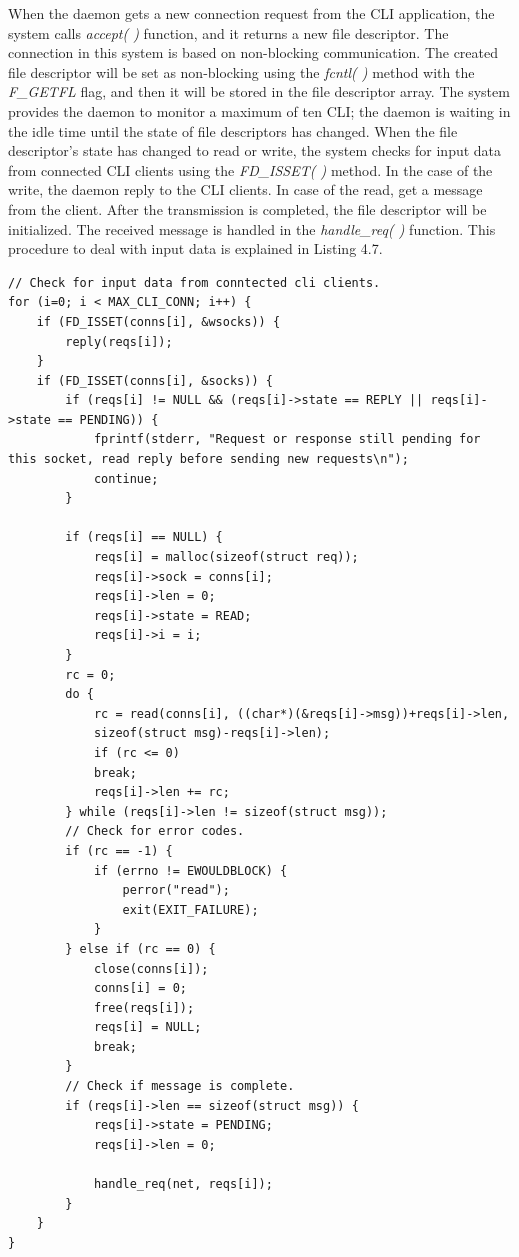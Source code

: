 When the daemon gets a new connection request from the CLI application, the system calls \textit{accept( )} function, and it returns a new file descriptor. The connection in this system is based on non-blocking communication. The created file descriptor will be set as non-blocking using the \textit{fcntl( )} method with the \textit{F\_GETFL} flag, and then it will be stored in the file descriptor array.
The system provides the daemon to monitor a maximum of ten CLI; the daemon is waiting in the idle time until the state of file descriptors has changed. When the file descriptor's state has changed to read or write, the system checks for input data from connected CLI clients using the \textit{FD\_ISSET( )} method. In the case of the write, the daemon reply to the CLI clients. In case of the read, get a message from the client. After the transmission is completed, the file descriptor will be initialized. The received message is handled in the \textit{handle\_req( )} function. This procedure to deal with input data is explained in Listing 4.7.

\lstset{language=C} 
\begin{lstlisting}[caption=The procedure to deal with input data]
// Check for input data from conntected cli clients.
for (i=0; i < MAX_CLI_CONN; i++) {
	if (FD_ISSET(conns[i], &wsocks)) {
		reply(reqs[i]);
	}
	if (FD_ISSET(conns[i], &socks)) {
		if (reqs[i] != NULL && (reqs[i]->state == REPLY || reqs[i]->state == PENDING)) {
			fprintf(stderr, "Request or response still pending for this socket, read reply before sending new requests\n");
			continue;
		}
		
		if (reqs[i] == NULL) {
			reqs[i] = malloc(sizeof(struct req));
			reqs[i]->sock = conns[i];
			reqs[i]->len = 0;
			reqs[i]->state = READ;
			reqs[i]->i = i;
		}
		rc = 0;
		do {
			rc = read(conns[i], ((char*)(&reqs[i]->msg))+reqs[i]->len,
			sizeof(struct msg)-reqs[i]->len);
			if (rc <= 0)
			break;
			reqs[i]->len += rc;
		} while (reqs[i]->len != sizeof(struct msg));
		// Check for error codes.
		if (rc == -1) {
			if (errno != EWOULDBLOCK) {
				perror("read");
				exit(EXIT_FAILURE);
			}
		} else if (rc == 0) {
			close(conns[i]);
			conns[i] = 0;
			free(reqs[i]);
			reqs[i] = NULL;
			break;
		}
		// Check if message is complete.
		if (reqs[i]->len == sizeof(struct msg)) {
			reqs[i]->state = PENDING;
			reqs[i]->len = 0;
			
			handle_req(net, reqs[i]);
		}
	}
}
	
\end{lstlisting}

